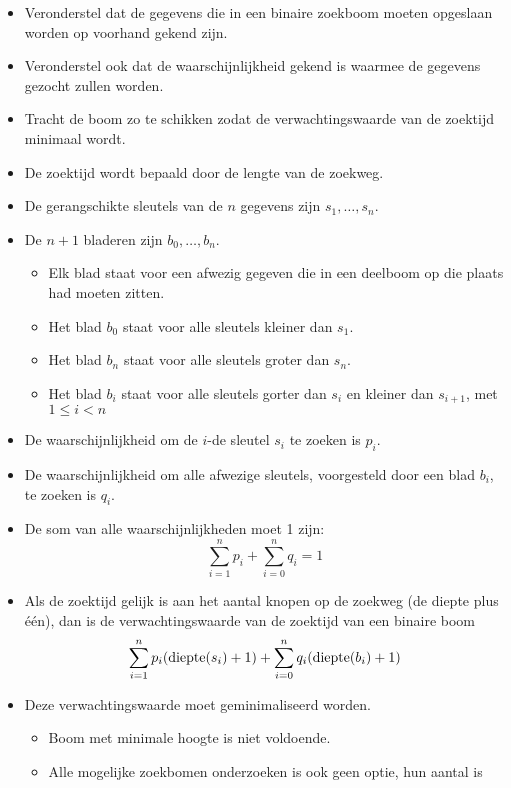 \begin{itemize}
    \item Veronderstel dat de gegevens die in een binaire zoekboom moeten opgeslaan worden op voorhand gekend zijn.
    \item Veronderstel ook dat de waarschijnlijkheid gekend is waarmee de gegevens gezocht zullen worden.
    \item Tracht de boom zo te schikken zodat de verwachtingswaarde van de zoektijd minimaal wordt.
    \item De zoektijd wordt bepaald door de lengte van de zoekweg.
    \item De gerangschikte sleutels van de $n$ gegevens zijn $s_1, \dots, s_n$.
    \item De $n + 1$ bladeren zijn $b_0, \dots, b_n$.
    \begin{itemize}
        \item Elk blad staat voor een afwezig gegeven die in een deelboom op die plaats had moeten zitten.
        \item Het blad $b_0$ staat voor alle sleutels kleiner dan $s_1$.
        \item Het blad $b_n$ staat voor alle sleutels groter dan $s_n$.
        \item Het blad $b_i$ staat voor alle sleutels gorter dan $s_i$ en kleiner dan $s_{i +1}$, met $1 \leq i < n$
    \end{itemize}
    \item De waarschijnlijkheid om de $i$-de sleutel $s_i$ te zoeken is $p_i$. 
    \item De waarschijnlijkheid om alle afwezige sleutels, voorgesteld door een blad $b_i$, te zoeken is $q_i$.
    \item De som van alle waarschijnlijkheden moet 1 zijn:
    $$\sum_{i = 1}^n p_i + \sum_{i = 0}^n q_i = 1$$
    \item Als de zoektijd gelijk is aan het aantal knopen op de zoekweg (de diepte plus één), dan is de verwachtingswaarde van de zoektijd van een binaire boom
    $$\sum_{i = 1}^n p_i (\hbox{diepte}(s_i) + 1) + \sum_{i = 0}^n q_i (\hbox{diepte}(b_i) + 1)$$
    \item Deze verwachtingswaarde moet geminimaliseerd worden.
    \begin{itemize}
        \item Boom met minimale hoogte is niet voldoende.
        \item Alle mogelijke zoekbomen onderzoeken is ook geen optie, hun aantal is 
        \begin{align*}

\end{align*}
\end{itemize}
\end{itemize}
